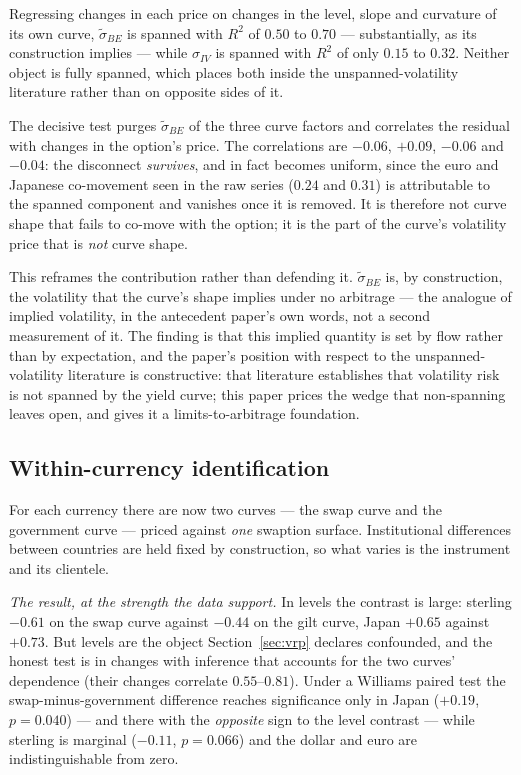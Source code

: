 \documentclass[11pt]{article}
\begin{document}
Regressing changes in each price on changes in the level, slope and curvature of its own curve,
$\tilde\sigma_{BE}$ is spanned with $R^2$ of $0.50$ to $0.70$ --- substantially, as its construction
implies --- while $\sigma_{IV}$ is spanned with $R^2$ of only $0.15$ to $0.32$. Neither object is fully
spanned, which places both inside the unspanned-volatility literature rather than on opposite sides of
it.

The decisive test purges $\tilde\sigma_{BE}$ of the three curve factors and correlates the residual
with changes in the option's price. The correlations are $-0.06$, $+0.09$, $-0.06$ and $-0.04$: the
disconnect \emph{survives}, and in fact becomes uniform, since the euro and Japanese co-movement seen
in the raw series ($0.24$ and $0.31$) is attributable to the spanned component and vanishes once it is
removed. It is therefore not curve shape that fails to co-move with the option; it is the part of the
curve's volatility price that is \emph{not} curve shape.

This reframes the contribution rather than defending it. $\tilde\sigma_{BE}$ is, by construction, the
volatility that the curve's shape implies under no arbitrage --- the analogue of implied volatility, in
the antecedent paper's own words, not a second measurement of it. The finding is that this implied
quantity is set by flow rather than by expectation, and the paper's position with respect to the
unspanned-volatility literature is constructive: that literature establishes that volatility risk is
not spanned by the yield curve; this paper prices the wedge that non-spanning leaves open, and gives it
a limits-to-arbitrage foundation.

\subsection{Within-currency identification}\label{sec:within}
For each currency there are now two curves --- the swap curve and the government curve --- priced
against \emph{one} swaption surface. Institutional differences between countries are held fixed by
construction, so what varies is the instrument and its clientele.

\emph{The result, at the strength the data support.} In levels the contrast is large: sterling
$-0.61$ on the swap curve against $-0.44$ on the gilt curve, Japan $+0.65$ against $+0.73$. But
levels are the object Section~\ref{sec:vrp} declares confounded, and the honest test is in changes
with inference that accounts for the two curves' dependence (their changes correlate $0.55$--$0.81$).
Under a Williams paired test the swap-minus-government difference reaches significance only in
Japan ($+0.19$, $p=0.040$) --- and there with the \emph{opposite} sign to the level contrast ---
while sterling is marginal ($-0.11$, $p=0.066$) and the dollar and euro are indistinguishable from
zero.
\end{document}
